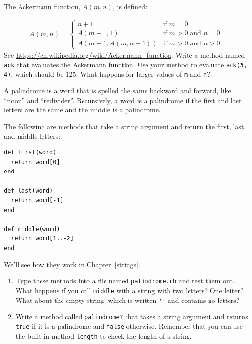 \documentclass[10pt]{book}
\begin{document}
\begin{exercise}
\label{ackermann}

The Ackermann function, $A(m, n)$, is defined:

\begin{eqnarray*}
A(m, n) = \begin{cases} 
              n+1 & \mbox{if } m = 0 \\ 
        A(m-1, 1) & \mbox{if } m > 0 \mbox{ and } n = 0 \\ 
A(m-1, A(m, n-1)) & \mbox{if } m > 0 \mbox{ and } n > 0.
\end{cases} 
\end{eqnarray*}
%
See \url{https://en.wikipedia.org/wiki/Ackermann_function}.
Write a method named {\tt ack} that evaluates the Ackermann function.
Use your method to evaluate {\tt ack(3, 4)}, which should be 125.
What happens for larger values of {\tt m} and {\tt n}?

\end{exercise}


\begin{exercise}
\label{palindrome}

A palindrome is a word that is spelled the same backward and
forward, like ``noon'' and ``redivider''.  Recursively, a word
is a palindrome if the first and last letters are the same
and the middle is a palindrome.

The following are methods that take a string argument and
return the first, last, and middle letters:

\begin{verbatim}
def first(word)
  return word[0]
end

def last(word)
  return word[-1]
end

def middle(word)
  return word[1..-2]
end
\end{verbatim}
%
We'll see how they work in Chapter~\ref{strings}.

\begin{enumerate}

\item Type these methods into a file named {\tt palindrome.rb}
and test them out.  What happens if you call {\tt middle} with
a string with two letters?  One letter?  What about the empty
string, which is written \verb"''" and contains no letters?

\item Write a method called \verb"palindrome?" that takes
a string argument and returns {\tt true} if it is a palindrome
and {\tt false} otherwise.  Remember that you can use the
built-in method {\tt length} to check the length of a string.

\end{enumerate}


\end{exercise}
\end{document}
